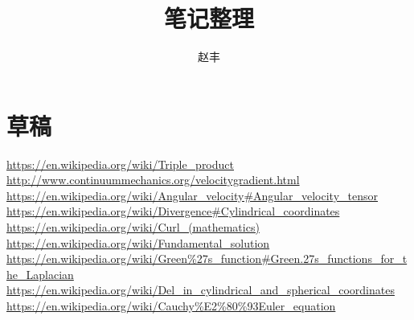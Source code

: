 \documentclass{article}
\begin{document}
\title{笔记整理}
\author{赵丰}
\maketitle
\section{草稿}

\begin{thebibliography}{99}
 \href{https://en.wikipedia.org/wiki/Triple_product}{https://en.wikipedia.org/wiki/Triple\_product}
\href{http://www.continuummechanics.org/velocitygradient.html}{http://www.continuummechanics.org/velocitygradient.html}
\href{https://en.wikipedia.org/wiki/Angular_velocity#Angular_velocity_tensor}{https://en.wikipedia.org/wiki/Angular\_velocity\#Angular\_velocity\_tensor}
\href{https://en.wikipedia.org/wiki/Divergence#Cylindrical_coordinates}{https://en.wikipedia.org/wiki/Divergence\#Cylindrical\_coordinates}
\href{https://en.wikipedia.org/wiki/Curl_(mathematics)}{https://en.wikipedia.org/wiki/Curl\_(mathematics)}
\href{https://en.wikipedia.org/wiki/Fundamental_solution}{https://en.wikipedia.org/wiki/Fundamental\_solution}
\href{https://en.wikipedia.org/wiki/Green\%27s_function#Green.27s_functions_for_the_Laplacian}{https://en.wikipedia.org/wiki/Green\%27s\_function\#Green.27s\_functions\_for\_the\_Laplacian}
\href{https://en.wikipedia.org/wiki/Del_in_cylindrical_and_spherical_coordinates}{https://en.wikipedia.org/wiki/Del\_in\_cylindrical\_and\_spherical\_coordinates}
\href{https://en.wikipedia.org/wiki/Cauchy\%E2\%80\%93Euler_equation}{https://en.wikipedia.org/wiki/Cauchy\%E2\%80\%93Euler\_equation}
\end{thebibliography}
\end{document}

